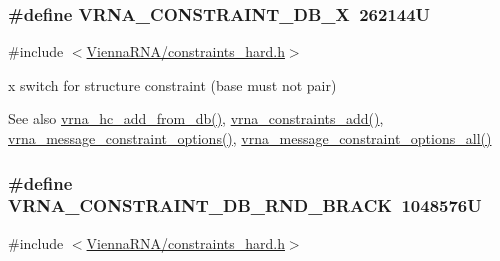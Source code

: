 \subsubsection[{V\+R\+N\+A\+\_\+\+C\+O\+N\+S\+T\+R\+A\+I\+N\+T\+\_\+\+D\+B\+\_\+\+X}]{\setlength{\rightskip}{0pt plus 5cm}\#define V\+R\+N\+A\+\_\+\+C\+O\+N\+S\+T\+R\+A\+I\+N\+T\+\_\+\+D\+B\+\_\+\+X~262144\+U}\label{group__hard__constraints_ga7283bbe0f8954f7b030ecc3f2d1932b2}


{\ttfamily \#include $<$\hyperlink{constraints__hard_8h}{Vienna\+R\+N\+A/constraints\+\_\+hard.\+h}$>$}



\textquotesingle{}x\textquotesingle{} switch for structure constraint (base must not pair) 

\begin{DoxySeeAlso}{See also}
\hyperlink{group__hard__constraints_ga5b4de3247b67358080c176b94591a8e6}{vrna\+\_\+hc\+\_\+add\+\_\+from\+\_\+db()}, \hyperlink{group__constraints_ga35a401f680969a556858a8dd5f1d07cc}{vrna\+\_\+constraints\+\_\+add()}, \hyperlink{group__constraints_gaa1f20b53bf09ac2e6b0dbb13f7d89670}{vrna\+\_\+message\+\_\+constraint\+\_\+options()}, \hyperlink{group__constraints_gaec7e13fa0465c2acc7a621d1aecb709f}{vrna\+\_\+message\+\_\+constraint\+\_\+options\+\_\+all()} 
\end{DoxySeeAlso}
\hypertarget{group__hard__constraints_gac17b034852c914bc5879954c65d7e74b}{}
\subsubsection[{V\+R\+N\+A\+\_\+\+C\+O\+N\+S\+T\+R\+A\+I\+N\+T\+\_\+\+D\+B\+\_\+\+R\+N\+D\+\_\+\+B\+R\+A\+C\+K}]{\setlength{\rightskip}{0pt plus 5cm}\#define V\+R\+N\+A\+\_\+\+C\+O\+N\+S\+T\+R\+A\+I\+N\+T\+\_\+\+D\+B\+\_\+\+R\+N\+D\+\_\+\+B\+R\+A\+C\+K~1048576\+U}\label{group__hard__constraints_gac17b034852c914bc5879954c65d7e74b}


{\ttfamily \#include $<$\hyperlink{constraints__hard_8h}{Vienna\+R\+N\+A/constraints\+\_\+hard.\+h}$>$}



